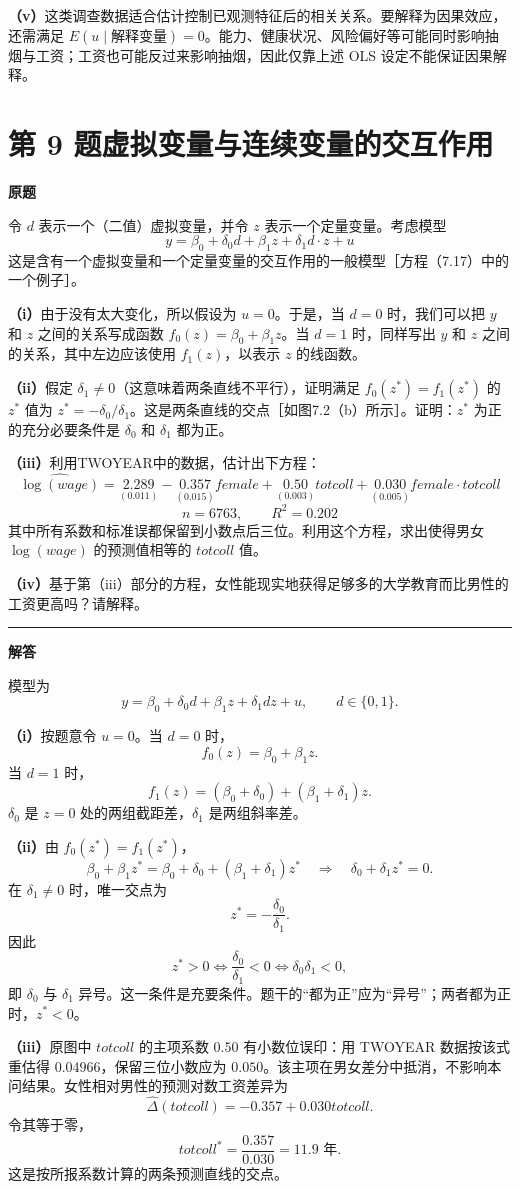 \documentclass[UTF8,a4paper,11pt,fontset=fandol]{ctexart}
\newcommand{\vr}[1]{\mathit{#1}}
\newcommand{\subq}[1]{\par\medskip\noindent\textbf{（#1）}\enspace}
\newcommand{\question}[2]{\def\currentquestiontitle{第 #1 题\quad #2}}
\newcommand{\coef}[2]{\underset{\scriptstyle(#2)}{#1}}
\newenvironment{originalquestion}{%
  \par\medskip\noindent\begin{minipage}{\linewidth}
  \section*{\currentquestiontitle}
  \par\smallskip\noindent\textbf{原题}\par\smallskip
  \begingroup\small\setlength{\parskip}{2.5pt}%
}{%
  \par\endgroup\end{minipage}\par\medskip\Needspace{6\baselineskip}
  \noindent\rule{\linewidth}{0.35pt}\par\smallskip
  \noindent\textbf{解答}\par
}
\begin{document}
\subq{v}这类调查数据适合估计控制已观测特征后的相关关系。要解释为因果效应，还需满足 $E(u\mid\text{解释变量})=0$。能力、健康状况、风险偏好等可能同时影响抽烟与工资；工资也可能反过来影响抽烟，因此仅靠上述 OLS 设定不能保证因果解释。

\question{9}{虚拟变量与连续变量的交互作用}
\begin{originalquestion}
令 $d$ 表示一个（二值）虚拟变量，并令 $z$ 表示一个定量变量。考虑模型
\[
y=\beta_0+\delta_0d+\beta_1z+\delta_1d\cdot z+u
\]
这是含有一个虚拟变量和一个定量变量的交互作用的一般模型［方程（7.17）中的一个例子］。

\subq{i}由于没有太大变化，所以假设为 $u=0$。于是，当 $d=0$ 时，我们可以把 $y$ 和 $z$ 之间的关系写成函数 $f_0(z)=\beta_0+\beta_1z$。当 $d=1$ 时，同样写出 $y$ 和 $z$ 之间的关系，其中左边应该使用 $f_1(z)$，以表示 $z$ 的线函数。

\subq{ii}假定 $\delta_1\ne0$（这意味着两条直线不平行），证明满足 $f_0(z^*)=f_1(z^*)$ 的 $z^*$ 值为 $z^*=-\delta_0/\delta_1$。这是两条直线的交点［如图7.2（b）所示］。证明：$z^*$ 为正的充分必要条件是 $\delta_0$ 和 $\delta_1$ 都为正。

\subq{iii}利用TWOYEAR中的数据，估计出下方程：
\[
\widehat{\log(\vr{wage})}
=\coef{2.289}{0.011}-\coef{0.357}{0.015}\vr{female}
+\coef{0.50}{0.003}\vr{totcoll}
+\coef{0.030}{0.005}\vr{female}\cdot\vr{totcoll}
\]
\[
n=6763,\qquad R^2=0.202
\]
其中所有系数和标准误都保留到小数点后三位。利用这个方程，求出使得男女 $\log(\vr{wage})$ 的预测值相等的 $\vr{totcoll}$ 值。

\subq{iv}基于第（iii）部分的方程，女性能现实地获得足够多的大学教育而比男性的工资更高吗？请解释。
\end{originalquestion}

模型为
\[
y=\beta_0+\delta_0d+\beta_1z+\delta_1dz+u,\qquad d\in\{0,1\}.
\]
\subq{i}按题意令 $u=0$。当 $d=0$ 时，
\[
f_0(z)=\beta_0+\beta_1z.
\]
当 $d=1$ 时，
\[
f_1(z)=(\beta_0+\delta_0)+(\beta_1+\delta_1)z.
\]
$\delta_0$ 是 $z=0$ 处的两组截距差，$\delta_1$ 是两组斜率差。

\subq{ii}由 $f_0(z^*)=f_1(z^*)$，
\[
\beta_0+\beta_1z^*
=\beta_0+\delta_0+(\beta_1+\delta_1)z^*
\quad\Longrightarrow\quad
\delta_0+\delta_1z^*=0.
\]
在 $\delta_1\ne0$ 时，唯一交点为
\[
\boxed{z^*=-\frac{\delta_0}{\delta_1}}.
\]
因此
\[
z^*>0
\iff \frac{\delta_0}{\delta_1}<0
\iff \delta_0\delta_1<0,
\]
即 $\delta_0$ 与 $\delta_1$ 异号。这一条件是充要条件。题干的“都为正”应为“异号”；两者都为正时，$z^*<0$。

\subq{iii}原图中 $\vr{totcoll}$ 的主项系数 $0.50$ 有小数位误印：用 TWOYEAR 数据按该式重估得 $0.04966$，保留三位小数应为 $0.050$。该主项在男女差分中抵消，不影响本问结果。女性相对男性的预测对数工资差异为
\[
\widehat\Delta(\vr{totcoll})
=-0.357+0.030\vr{totcoll}.
\]
令其等于零，
\[
\vr{totcoll}^{*}=\frac{0.357}{0.030}
=\boxed{11.9\text{ 年}}.
\]
这是按所报系数计算的两条预测直线的交点。
\end{document}
